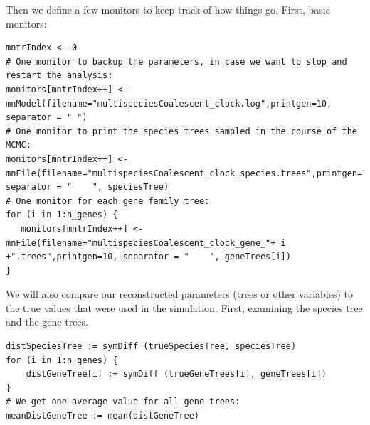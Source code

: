 \documentclass[11pt]{article}
\begin{document}
{\begin{framed}
Then we define a few monitors to keep track of how things go. 
First, basic monitors:
{\tt \begin{snugshade*}
\begin{lstlisting}
mntrIndex <- 0
# One monitor to backup the parameters, in case we want to stop and restart the analysis:
monitors[mntrIndex++] <- mnModel(filename="multispeciesCoalescent_clock.log",printgen=10, separator = "	")
# One monitor to print the species trees sampled in the course of the MCMC:
monitors[mntrIndex++] <- mnFile(filename="multispeciesCoalescent_clock_species.trees",printgen=10, separator = "	", speciesTree)
# One monitor for each gene family tree:
for (i in 1:n_genes) {
   monitors[mntrIndex++] <- mnFile(filename="multispeciesCoalescent_clock_gene_"+ i +".trees",printgen=10, separator = "	", geneTrees[i])
}
\end{lstlisting}
\end{snugshade*}}
We will also compare our reconstructed parameters (trees or other variables) to the true values that were used in the simulation.
First, examining the species tree and the gene trees.
{\tt \begin{snugshade*}
\begin{lstlisting}
distSpeciesTree := symDiff (trueSpeciesTree, speciesTree)
for (i in 1:n_genes) {
	distGeneTree[i] := symDiff (trueGeneTrees[i], geneTrees[i])
}
# We get one average value for all gene trees:
meanDistGeneTree := mean(distGeneTree)
\end{lstlisting}
\end{snugshade*}}


\end{framed}}
\end{document}
